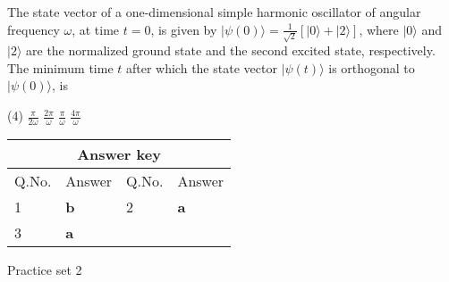 \begin{enumerate}
\begin{tasks}
\end{tasks}
\begin{minipage}{\textwidth}
	\item The state vector of a one-dimensional simple harmonic oscillator of angular frequency $\omega$, at time $t=0$, is given by $|\psi(0)\rangle=\frac{1}{\sqrt{2}}[|0\rangle+|2\rangle]$, where $|0\rangle$ and $|2\rangle$ are the normalized ground state and the second excited state, respectively. The minimum time $t$ after which the state vector $|\psi(t)\rangle$ is orthogonal to $|\psi(0)\rangle$, is
\end{minipage}
\begin{tasks}(4)
	\task[\textbf{A.}] $\frac{\pi}{2 \omega}$
	\task[\textbf{B.}]$\frac{2 \pi}{\omega}$
	\task[\textbf{C.}]$\frac{\pi}{\omega}$
	\task[\textbf{D.}]$\frac{4 \pi}{\omega}$
\end{tasks}
\end{enumerate}
\setlength\arrayrulewidth{1pt}
\begin{table}[H]
	\centering
	
	\begin{tabular}{|p{1.5cm}|p{1.5cm}||p{1.5cm}|p{1.5cm}|}
		\hline
		\multicolumn{4}{|c|}{\textbf{Answer key}}\\\hline\hline
		\rowcolor{ocrel}Q.No.&Answer&Q.No.&Answer\\\hline
		1&\textbf{b}&2&\textbf{a}\\\hline
		3&\textbf{a}&&\\\hline
	\end{tabular}
\end{table}
\newpage
\begin{abox}
	Practice set 2
	\end{abox}
